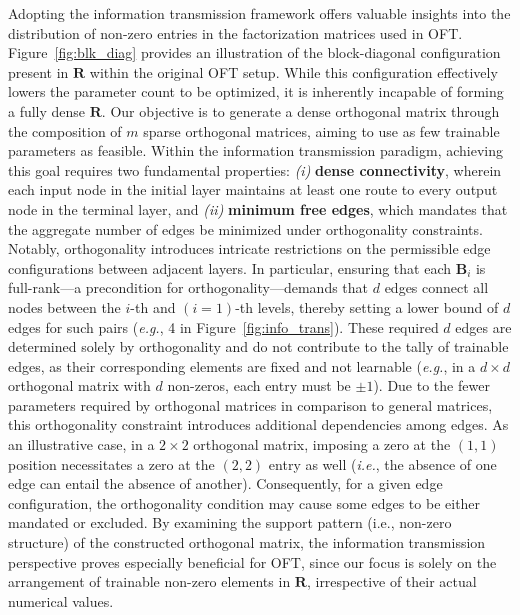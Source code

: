 Adopting the information transmission framework offers valuable insights into the distribution of non-zero entries in the factorization matrices used in OFT. Figure~\ref{fig:blk_diag} provides an illustration of the block-diagonal configuration present in $\bm{R}$ within the original OFT setup. While this configuration effectively lowers the parameter count to be optimized, it is inherently incapable of forming a fully dense $\bm{R}$. Our objective is to generate a dense orthogonal matrix through the composition of $m$ sparse orthogonal matrices, aiming to use as few trainable parameters as feasible. Within the information transmission paradigm, achieving this goal requires two fundamental properties: \emph{(i)} \textbf{dense connectivity}, wherein each input node in the initial layer maintains at least one route to every output node in the terminal layer, and \emph{(ii)} \textbf{minimum free edges}, which mandates that the aggregate number of edges be minimized under orthogonality constraints. Notably, orthogonality introduces intricate restrictions on the permissible edge configurations between adjacent layers. In particular, ensuring that each $\bm{B}_i$ is full-rank—a precondition for orthogonality—demands that $d$ edges connect all nodes between the $i$-th and $(i=1)$-th levels, thereby setting a lower bound of $d$ edges for such pairs (\emph{e.g.}, 4 in Figure~\ref{fig:info_trans}). These required $d$ edges are determined solely by orthogonality and do not contribute to the tally of trainable edges, as their corresponding elements are fixed and not learnable (\emph{e.g.}, in a $d\times d$ orthogonal matrix with $d$ non-zeros, each entry must be $\pm 1$). Due to the fewer parameters required by orthogonal matrices in comparison to general matrices, this orthogonality constraint introduces additional dependencies among edges. As an illustrative case, in a $2\times 2$ orthogonal matrix, imposing a zero at the $(1,1)$ position necessitates a zero at the $(2,2)$ entry as well (\emph{i.e.}, the absence of one edge can entail the absence of another). Consequently, for a given edge configuration, the orthogonality condition may cause some edges to be either mandated or excluded. By examining the support pattern (i.e., non-zero structure) of the constructed orthogonal matrix, the information transmission perspective proves especially beneficial for OFT, since our focus is solely on the arrangement of trainable non-zero elements in $\bm{R}$, irrespective of their actual numerical values.

